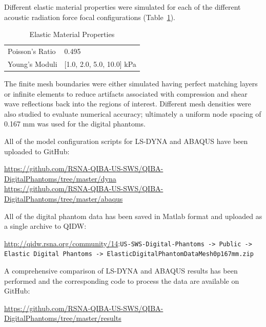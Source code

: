 Different elastic material properties were simulated for each of the different
acoustic radiation force focal configurations (Table~\ref{table:elastic}).

\begin{table}[htb!]
    \centering
    \caption{Elastic Material Properties}
    \begin{tabular}{|l|l|}
    \hline
    Poisson's Ratio & 0.495 \\
    Young's Moduli &  [1.0, 2.0, 5.0, 10.0] kPa \\
    \hline
    \end{tabular}
\label{table:elastic}
\end{table}

The finite mesh boundaries were either simulated having perfect matching layers
or infinite elements to reduce artifacts associated with compression and
shear wave reflections back into the regions of interest.  Different mesh densities were also studied to evaluate numerical accuracy; ultimately a uniform node spacing of 0.167 mm was used for the digital phantoms.

All of the model configuration scripts for LS-DYNA and ABAQUS have been uploaded to GitHub:

\url{https://github.com/RSNA-QIBA-US-SWS/QIBA-DigitalPhantoms/tree/master/dyna}\\
\url{https://github.com/RSNA-QIBA-US-SWS/QIBA-DigitalPhantoms/tree/master/abaqus}

All of the digital phantom data has been saved in Matlab format and uploaded as
a single archive to QIDW:

\url{http://qidw.rsna.org/community/14}:\verb+US-SWS-Digital-Phantoms -> Public ->+\\
\verb+Elastic Digital Phantoms -> ElasticDigitalPhantomDataMesh0p167mm.zip+

A comprehensive comparison of LS-DYNA and ABAQUS results has been performed
and the corresponding code to process the data are available on GitHub:

\url{https://github.com/RSNA-QIBA-US-SWS/QIBA-DigitalPhantoms/tree/master/results}

